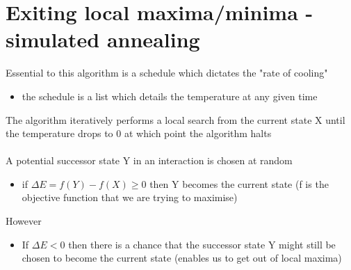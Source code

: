 \documentclass{article}[18pt]
\begin{document}
\section{Exiting local maxima/minima - simulated annealing}
Essential to this algorithm is a schedule which dictates the "rate of cooling"
\begin{itemize}
	\item the schedule is a list which details the temperature at any given time
\end{itemize}
The algorithm iteratively performs a local search from the current state X until the temperature drops to 0 at which point the algorithm halts\\
\\
A potential successor state Y in an interaction is chosen at random
\begin{itemize}
	\item if $\Delta E=f(Y)-f(X)\geqslant 0$ then Y becomes the current state (f is the objective function that we are trying to maximise)
\end{itemize}
However
\begin{itemize}
	\item If $\Delta E<0$ then there is a chance that the successor state Y might still be chosen to become the current state (enables us to get out of local maxima)
\end{itemize}
\end{document}
